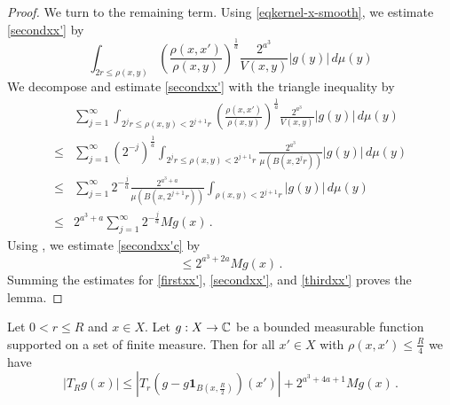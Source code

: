 \begin{proof}
We turn to the remaining term. Using \eqref{eqkernel-x-smooth}, we estimate \eqref{secondxx'} by
\begin{equation}\label{secondxx'b}
 \int_{2r\le\rho(x,y)} \left(\frac{\rho(x,x')}{\rho(x,y)}\right)^{\frac{1}{a}}\frac{2^{a^3}}{V(x,y)} |g(y)| \,d\mu(y)
\end{equation}
We decompose and estimate
\eqref{secondxx'}
with the triangle inequality by
\begin{align}
 &\sum_{j=1}^\infty  \int_{2^jr\le\rho(x,y)< 2^{j+1}r}
 \left(\frac{\rho(x,x')}{\rho(x,y)}\right)^{\frac{1}{a}}\frac{2^{a^3}}{V(x,y)} |g(y)| \,d\mu(y)\, \\
 \le&
 \sum_{j=1}^\infty \left( 2^{-j} \right)^{\frac{1}{a}} \int_{2^jr\le\rho(x,y)< 2^{j+1}r} \frac{2^{a^3}}{\mu(B(x,2^j r))} |g(y)| \,d\mu(y) \\
 \le&
\sum_{j=1}^\infty 2^{-\frac{j}{a}} \frac{2^{a^3 + a}}{\mu(B(x,2^{j+1} r))} \int_{\rho(x,y)<2^{j+1}r}
|g(y)| \, d\mu(y) \\
\label{secondxx'c}
\le& 2^{a^3 + a} \sum_{j=1}^\infty 2^{-\frac{j}{a}} Mg(x)\,.
\end{align}
Using , we estimate
\eqref{secondxx'c} by
\begin{equation}\label{secondxx'd}
\le 2^{a^3 + 2a} Mg(x) \,.
\end{equation}
Summing the estimates
for \eqref{firstxx'},
\eqref{secondxx'}, and
\eqref{thirdxx'}
proves the lemma.
\end{proof}

\begin{lemma}
\label{Cotlar-control}
Let $0<r\le R$ and  $x\in X$. Let $g:X\to{\mathbb{C}}$ be a bounded measurable function supported on a set of finite measure.
Then for all $x'\in X$ with $\rho(x,x')\le\frac {R}{4}$ we have
\begin{equation}\label{eq-cotlar-control}
\left|T_R g(x)
\right|\le
|T_r(g-g\mathbf{1}_{B(x,\frac {R} 2)})(x')| +
2^{a^3 + 4a + 1} Mg(x)\, .
\end{equation}
\end{lemma}

